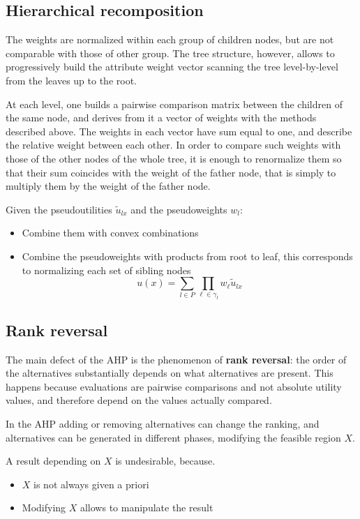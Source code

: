 \subsection{Hierarchical recomposition}

The weights are normalized within each group of children nodes, but are not comparable with those of other group. The tree structure, however, allows to progressively build the attribute weight vector scanning the tree level-by-level from the leaves up to the root.

At each level, one builds a pairwise comparison matrix between the children of the same node, and derives from it a vector of weights with the methods described above. The weights in each vector have sum equal to one, and describe the relative weight between each other. In order to compare such weights with those of the other nodes of the whole tree, it is enough to renormalize them so that their sum coincides with the weight of the father node, that is simply to multiply them by the weight of the father node.

Given the pseudoutilities $\tilde u_{lx}$ and the pseudoweights $w_l$: 
\begin{itemize}
	\item Combine them with convex combinations
	
	\item Combine the pseudoweights with products from root to leaf, this corresponds to normalizing each set of sibling nodes
	$$ u(x) = \sum_{l \in P} \prod_{\ell \in \gamma_l} w_\ell \tilde u_{lx} $$
\end{itemize}

\subsection{Rank reversal}

The main defect of the AHP is the phenomenon of \textbf{rank reversal}: the order of the alternatives substantially depends on what alternatives are present. This happens because evaluations are pairwise comparisons and not absolute utility values, and therefore depend on the values actually compared.

In the AHP adding or removing alternatives can change the ranking, and alternatives can be generated in different phases, modifying the feasible region $X$.

A result depending on $X$ is undesirable, because. 
\begin{itemize}
	\item $X$ is not always given a priori
	
	\item Modifying $X$ allows to manipulate the result
\end{itemize}

